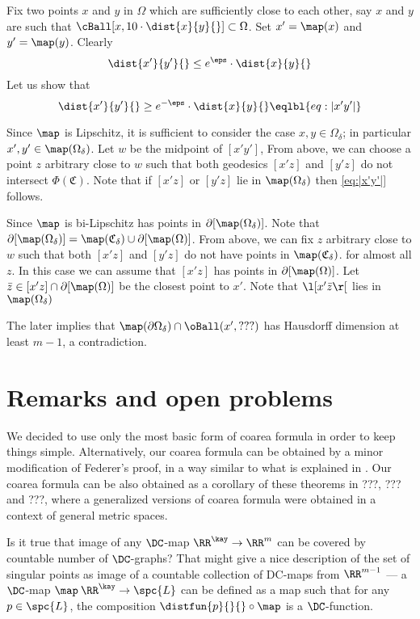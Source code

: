 Fix two points $x$ and $y$ in $\Omega$ which are sufficiently close to each other, 
say $x$ and $y$ 
are such that $\cBall[x,10\cdot\dist{x}{y}{}]\subset\Omega$.
Set $x'=\map(x)$ and $y'=\map(y)$.
Clearly 
\[\dist{x'}{y'}{}
\le
e^{\eps}\cdot\dist{x}{y}{}\]
Let us show that
\[\dist{x'}{y'}{}
\ge
e^{-\eps}\cdot\dist{x}{y}{}
\eqlbl{eq:|x'y'|}\]

Since $\map$ is Lipschitz, 
it is sufficient to consider the case $x,y\in \Omega_\delta$;
in particular $x',y'\in\map(\Omega_\delta)$.
Let $w$ be the midpoint of $[x'y']$,
From above, we can choose a point $z$ arbitrary close to $w$
such that both geodesics $[x'z]$ and $[y'z]$ do not intersect 
$\Phi(\mathfrak{C})$.
Note that if $[x'z]$ or $[y'z]$ lie in $\map(\Omega_\delta)$
then \ref{eq:|x'y'|} follows.

Since $\map$ is bi-Lipschitz 
has points in $\partial [\map(\Omega_\delta)]$.
Note that $\partial [\map(\Omega_\delta)]=\map(\mathfrak{C}_\delta)\cup\partial[\map(\Omega)]$.
From above, we can fix $z$ arbitrary close to $w$
such that both $[x'z]$ and $[y'z]$
do not have points in $\map(\mathfrak{C}_\delta)$.
for almost all $z$.
In this case we can assume that $[x'z]$ has points in $\partial[\map(\Omega)]$.
Let $\bar z\in [x'z]\cap\partial[\map(\Omega)]$ be the closest point to $x'$.
Note that $\l[x'\bar z\r[$ lies in $\map(\Omega_\delta)$


The later implies that $\map(\partial \Omega_\delta)\cap \oBall(x',???)$ has Hausdorff dimension at least $m-1$,
a contradiction.
\qeds



\section{Remarks and open problems}

We decided to use only the most basic form of coarea formula
in order to keep things simple.
Alternatively, our coarea formula can be obtained
by a minor modification of Federer's proof,
in a way similar to what is explained in \cite[3.2.46]{federer}.
Our coarea formula can be also obtained as a corollary of these theorems in ???, ??? and ???, where a generalized versions of coarea formula were obtained in a context of general metric spaces.

Is it true that image of any $\DC$-map $\RR^\kay\to\RR^m$ can be covered by countable number of $\DC$-graphs? 
That might give a nice description of the set of singular points as image of a countable collection of DC-maps from $\RR^{m-1}$ --- a $\DC$-map $\map\:\RR^\kay\to\spc{L}$ can be defined as a map such that for any $p\in\spc{L}$, the composition $\distfun{p}{}{}\circ\map$ is a $\DC$-function.

